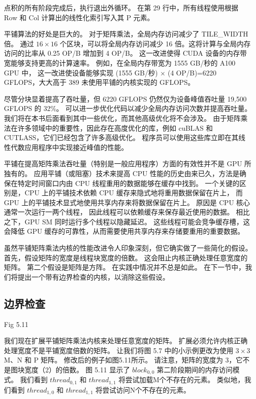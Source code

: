 点积的所有阶段完成后，执行退出外循环。 在第 29 行中，所有线程使用根据 Row 和 Col 计算出的线性化索引写入其 P 元素。

平铺算法的好处是巨大的。 对于矩阵乘法，全局内存访问减少了 TILE\_WIDTH 倍。 
通过 $16 \times 16$ 个区块，可以将全局内存访问减少 16 倍。这将计算与全局内存访问的比率从 0.25 OP/B 增加到 4 OP/B。 
这一改进使得 CUDA 设备的内存带宽能够支持更高的计算速率。 
例如，在全局内存带宽为 1555 GB/秒的 A100 GPU 中，
这一改进使设备能够实现 (1555 GB/秒) × (4 OP/B)=6220 GFLOPS，大大高于 389 未使用平铺的内核实现的 GFLOPS。

尽管分块显着提高了吞吐量，但 6220 GFLOPS 仍然仅为设备峰值吞吐量 19,500 GFLOPS 的 32\%。 
可以进一步优化代码以减少全局内存访问次数并提高吞吐量。 我们将在本书后面看到其中一些优化，而其他高级优化将不会涉及。 
由于矩阵乘法在许多领域中的重要性，因此存在高度优化的库，例如 cuBLAS 和 CUTLASS，它们已经包含了许多高级优化。 
程序员可以使用这些库立即在其线性代数应用程序中实现接近峰值的性能。

平铺在提高矩阵乘法吞吐量（特别是一般应用程序）方面的有效性并不是 GPU 所独有的。 
应用平铺（或阻塞）技术来提高 CPU 性能的历史由来已久，方法是确保在特定时间窗口内由 CPU 线程重用的数据能够在缓存中找到。 
一个关键的区别是，CPU 上的平铺技术依赖 CPU 缓存来隐式地将重用数据保留在片上，
而 GPU 上的平铺技术显式地使用共享内存来将数据保留在片上。 原因是 CPU 核心通常一次运行一两个线程，
因此线程可以依赖缓存来保存最近使用的数据。 相比之下，GPU SM 同时运行多个线程以隐藏延迟。 
这些线程可能会竞争缓存槽，这会降低 GPU 缓存的可靠性，从而需要使用共享内存来存储要重用的重要数据。

虽然平铺矩阵乘法内核的性能改进令人印象深刻，但它确实做了一些简化的假设。 首先，假设矩阵的宽度是线程块宽度的倍数。 
这会阻止内核正确处理任意宽度的矩阵。 第二个假设是矩阵是方阵。 在实践中情况并不总是如此。 
在下一节中，我们将提出一个带有边界检查的内核，以消除这些假设。

\subsection{边界检查}
{\color{red} Fig 5.11}

我们现在扩展平铺矩阵乘法内核来处理任意宽度的矩阵。 扩展必须允许内核正确处理宽度不是平铺宽度倍数的矩阵。 
让我们将图 5.7 中的小示例更改为使用 $3 \times 3$ M、N 和 P 矩阵。 修改后的例子如图5.11所示。 
请注意，矩阵的宽度为 3，它不是图块宽度（2）的倍数。 图 5.11 显示了 $block_{0,0}$ 第二阶段期间的内存访问模式。 
我们看到 $thread_{0,1}$ 和 $thread_{1,1}$ 将尝试加载M个不存在的元素。 
类似地，我们看到 $thread_{1,0}$ 和 $thread_{1,1}$ 将尝试访问N个不存在的元素。

